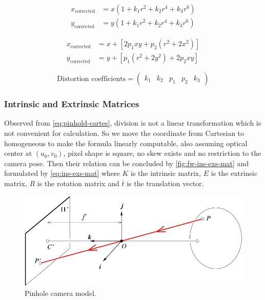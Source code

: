 \begin{equation}
\begin{aligned} x_{\text {corrected}} &=x\left(1+k_{1} r^{2}+k_{2} r^{4}+k_{3}
r^{6}\right) \\ y_{\text {corrected}} &=y\left(1+k_{1} r^{2}+k_{2} r^{4}+k_{3}
r^{6}\right) \end{aligned}
\label{eq:radial}
\end{equation}

\begin{equation}
\begin{aligned} x_{\text {corrected}} &=x+\left[2 p_{1} x y+p_{2}\left(r^{2}+2
x^{2}\right)\right] \\ y_{\text {corrected}} &=y+\left[p_{1}\left(r^{2}+2
y^{2}\right)+2 p_{2} x y\right] \end{aligned}
\label{eq:tangential}
\end{equation}

\begin{equation}
\text {Distortion coefficients}=\left( \begin{array}{lllll}{k_{1}} & {k_{2}} &
{p_{1}} & {p_{2}} & {k_{3}}\end{array}\right)
\label{eq:disortion-model}
\end{equation}

\subsubsection{Intrinsic and Extrinsic Matrices}
\label{sec:Impl-ins-exs-mat}

Observed from \autoref{eq:pinhold-cartes}, division is not a linear
transformation which is not convenient for calculation. So we move the
coordinate from Cartesian to homogeneous to make the formula linearly
computable, also assuming optical center at $(u_0, v_0)$, pixel shape is
square, no skew exists and no restriction to the camera pose.
Then their relation can be concluded by \autoref{fig:fw-ins-exs-mat} and
formulated by \autoref{eq:ins-exs-mat} where $K$ is the intrinsic matrix, $E$
is the extrinsic matrix, $R$ is the rotation matrix and $\overline{t}$ is the
translation vector.

\begin{figure}
	\centering
    \includegraphics[scale=0.4]{figures/framework_pinhole_camera.png}
    \caption{Pinhole camera model.}
    \label{fig:fw-pinhole}
\end{figure}

